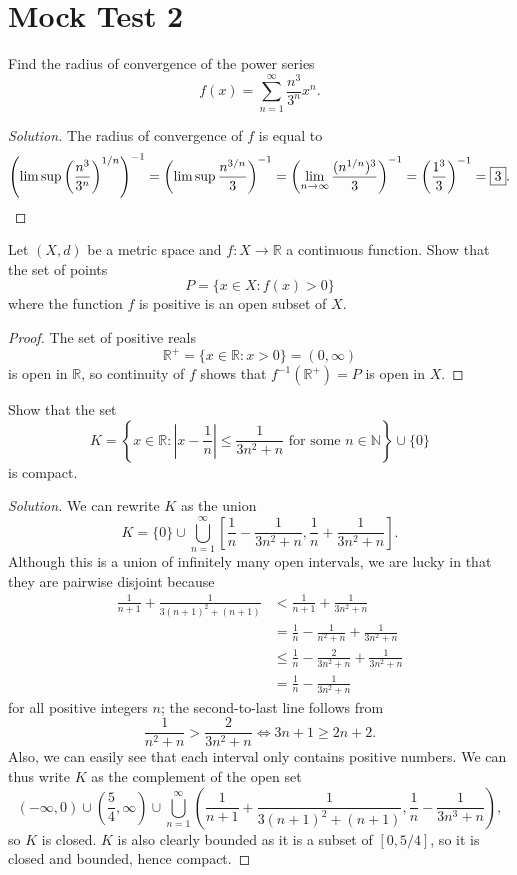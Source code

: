 \documentclass[11pt]{scrartcl}
\providecommand{\NN}{\mathbb N}
\providecommand{\RR}{\mathbb R}
\providecommand{\inv}{^{-1}}
\providecommand{\abs}[1]{\left|#1\right|}
\newenvironment{soln}{\begin{proof}[Solution]}{\end{proof}}
\begin{document}
\pagebreak
\section{Mock Test 2}
\begin{problem}
	Find the radius of convergence of the power series
	\[f(x) = \sum_{n=1}^\infty \frac{n^3}{3^n} x^n.\]
\end{problem}
\begin{soln}
	The radius of convergence of $f$ is equal to
	\[\left(\limsup \left(\frac{n^3}{3^n}\right)^{1/n}\right)\inv
	= \left(\limsup \frac{n^{3/n}}{3}\right)\inv
	= \left(\lim_{n\to\infty} \frac{(n^{1/n})^3}{3}\right)\inv
	= \left(\frac{1^3}3\right)\inv = \boxed 3.\qedhere\]
\end{soln}

\pagebreak
\begin{problem}
	Let $(X, d)$ be a metric space and $f\colon X\to\RR$ a continuous function.
	Show that the set of points
	\[P = \{x\in X : f(x) > 0\}\]
	where the function $f$ is positive
	is an open subset of $X$.
\end{problem}
\begin{proof}
	The set of positive reals
	\[\RR^+ =\{x\in\RR: x > 0\} = (0, \infty)\]
	is open in $\RR$, so continuity of $f$ shows that
	$f\inv(\RR^+) = P$ is open in $X$.
\end{proof}

\pagebreak
\begin{problem}
	Show that the set
	\[K = \left\{x\in\RR : \abs{x - \frac 1n} \le \frac{1}{3n^2 + n}
	\text{ for some }n\in\NN\right\}\cup\{0\}\]
	is compact.
\end{problem}

\begin{soln}
	We can rewrite $K$ as the union
	\[K = \{0\}\cup\bigcup_{n=1}^\infty
	\left[\frac1n - \frac{1}{3n^2+n}, \frac1n + \frac1{3n^2+n}\right].\]
	Although this is a union of infinitely many open intervals,
	we are lucky in that they are pairwise disjoint because
	\begin{align*}
		\frac{1}{n+1} + \frac{1}{3(n+1)^2 + (n+1)} &<
		\frac{1}{n+1} + \frac{1}{3n^2 + n}\\
		&= \frac{1}{n} - \frac{1}{n^2 + n} + \frac{1}{3n^2 + n}\\
		&\le \frac1n - \frac{2}{3n^2 + n} + \frac{1}{3n^2 + n}\\
		&= \frac{1}{n} - \frac{1}{3n^2 + n}
	\end{align*}
	for all positive integers $n$;
	the second-to-last line follows from
	\[\frac{1}{n^2 + n} > \frac{2}{3n^2 + n} \iff
	3n + 1 \ge 2n + 2.\]
	Also, we can easily see that each interval only contains positive numbers.
	We can thus write $K$ as the complement of the open set
	\[(-\infty, 0)\cup \left(\frac54, \infty\right)\cup
	\bigcup_{n=1}^\infty \left(\frac{1}{n+1} + \frac{1}{3(n+1)^2 + (n+1)},
	\frac1n - \frac{1}{3n^3 + n}\right),\]
	so $K$ is closed.
	$K$ is also clearly bounded as it is a subset of $[0,5/4]$,
	so it is closed and bounded, hence compact.
\end{soln}
\end{document}
